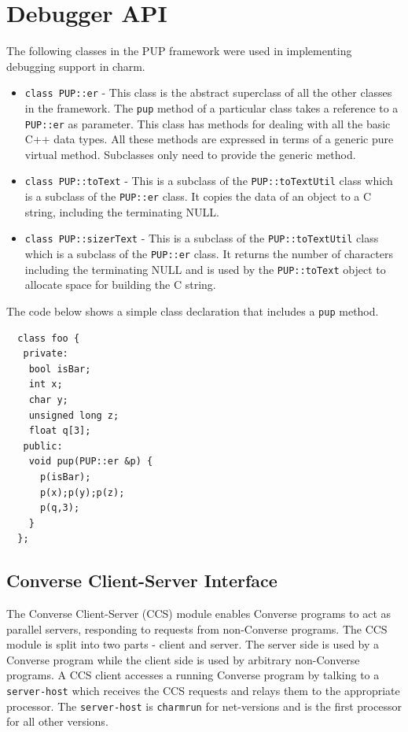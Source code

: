 \documentclass[10pt,dvips]{article}
\begin{document}
\section{Debugger API}

The following classes in the PUP framework were used in
implementing debugging support in charm.


\begin{itemize}

\item

\texttt{class PUP::er} - This class is the abstract superclass of
all the other classes in the framework. The \texttt{pup} method of
a particular class takes a reference to a \texttt{PUP::er} as
parameter. This class has methods for dealing with all the basic
C++ data types. All these methods are expressed in terms of a
generic pure virtual method. Subclasses only need to provide the
generic method.

\item

\texttt{class PUP::toText} - This is a subclass of the
\texttt{PUP::toTextUtil} class which is a subclass of the
\texttt{PUP::er} class. It copies the data of an object to a C
string, including the terminating NULL.

\item

\texttt{class PUP::sizerText} - This is a subclass of the
\texttt{PUP::toTextUtil} class which is a subclass of the
\texttt{PUP::er} class. It returns the number of characters
including the terminating NULL and is used by the
\texttt{PUP::toText} object to allocate space for building the C
string.

\end{itemize}


The code below shows a simple class declaration
that includes a \texttt{pup} method.


\begin{verbatim}
  class foo {
   private:
    bool isBar;
    int x;
    char y;
    unsigned long z;
    float q[3];
   public:
    void pup(PUP::er &p) {
      p(isBar);
      p(x);p(y);p(z);
      p(q,3);
    }
  };
\end{verbatim}


\subsection{Converse Client-Server Interface}

The Converse Client-Server (CCS) module enables Converse
\cite{InterOpIPPS96} programs to act as parallel servers,
responding to requests from non-Converse programs. The CCS module
is split into two parts - client and server. The server side is
used by a Converse program while the client side is used by
arbitrary non-Converse programs. A CCS client accesses a running
Converse program by talking to a \texttt{server-host} which
receives the CCS requests and relays them to the appropriate
processor. The \texttt{server-host} is \texttt{charmrun}
\cite{charmman} for net-versions and is the first processor for
all other versions.
\end{document}

